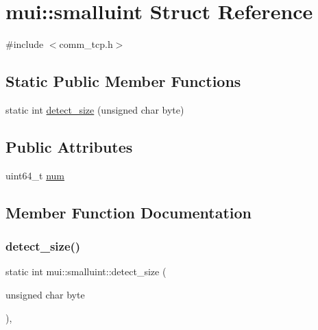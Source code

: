 \hypertarget{structmui_1_1smalluint}{}\section{mui\+:\+:smalluint Struct Reference}
\label{structmui_1_1smalluint}


{\ttfamily \#include $<$comm\+\_\+tcp.\+h$>$}

\subsection*{Static Public Member Functions}
\begin{DoxyCompactItemize}
\item 
static int \hyperlink{structmui_1_1smalluint_a4103073fb8cb66990375ee291c7cda9a}{detect\+\_\+size} (unsigned char byte)
\end{DoxyCompactItemize}
\subsection*{Public Attributes}
\begin{DoxyCompactItemize}
\item 
uint64\+\_\+t \hyperlink{structmui_1_1smalluint_a886826793cb7201c57751dc505404875}{num}
\end{DoxyCompactItemize}


\subsection{Member Function Documentation}
\mbox{\label{structmui_1_1smalluint_a4103073fb8cb66990375ee291c7cda9a}} 
\subsubsection{\texorpdfstring{detect\+\_\+size()}{detect\_size()}}
{\footnotesize\ttfamily static int mui\+::smalluint\+::detect\+\_\+size (\begin{DoxyParamCaption}\item[{unsigned char}]{byte }\end{DoxyParamCaption})\hspace{0.3cm}{\ttfamily [inline]}, {\ttfamily [static]}}



